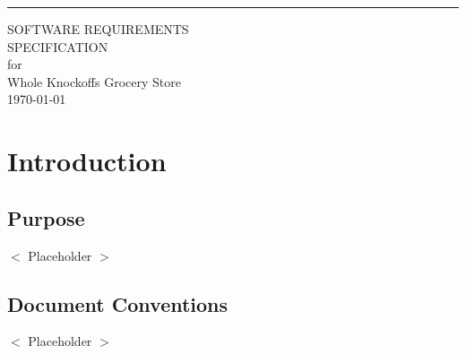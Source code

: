 \documentclass{scrreprt}
\date{}
\def\myversion{1.0 }
\begin{document}
\begin{flushright}
    \rule{16cm}{5pt}\vskip1cm
    \begin{bfseries}
        \Huge{SOFTWARE REQUIREMENTS\\ SPECIFICATION}\\
        \vspace{1.9cm}
        for\\
        \vspace{1.9cm}
        Whole Knockoffs Grocery Store\\
        \vspace{1.9cm}
        \today\\
    \end{bfseries}
\end{flushright}

\tableofcontents


%

\chapter{Introduction}

\section{Purpose}
$<$ Placeholder $>$

\section{Document Conventions}
$<$ Placeholder $>$
\end{document}
